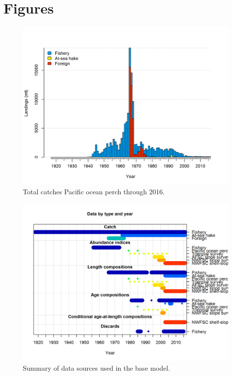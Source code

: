 \documentclass[12pt,]{article}
\begin{document}
\section{Figures}\label{figures}

\FloatBarrier

\begin{figure}
\centering
\includegraphics{r4ss/plots_mod1/catch2 landings stacked.png}
\caption{Total catches Pacific ocean perch through 2016.
\label{fig:Catch}}
\end{figure}

\FloatBarrier

\begin{figure}
\centering
\includegraphics{r4ss/plots_mod1/data_plot.png}
\caption{Summary of data sources used in the base model.
\label{fig:data_plot}}
\end{figure}
\end{document}
